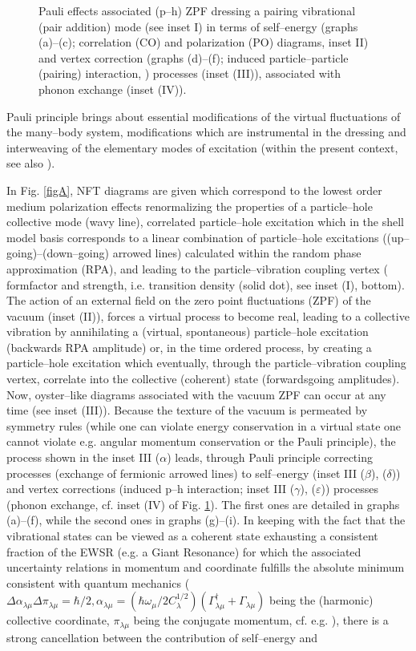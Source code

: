 \begin{subappendices}
\begin{figure}[h!]
\begin{center}
\end{center}
\caption{Pauli effects associated (p--h) ZPF dressing a pairing vibrational (pair addition) mode (see inset I) in terms of self--energy (graphs (a)--(c); correlation (CO) and polarization (PO) diagrams, inset II) and vertex correction (graphs (d)--(f); induced particle--particle (pairing) interaction, ) processes (inset (III)), associated with phonon exchange (inset (IV)).}\label{figB}
\end{figure}
Pauli principle \citep{Pauli:25} brings about essential modifications of the virtual fluctuations of the many--body system, modifications which are instrumental in the dressing and interweaving of the elementary modes of excitation  (within the present context, see also \cite{Schrieffer:64}).


In Fig.  \ref{figA}, NFT diagrams are given which correspond to the lowest order medium polarization effects renormalizing the properties of a particle--hole collective mode (wavy line), correlated particle--hole excitation which in the shell model basis corresponds to a  linear combination of particle--hole excitations ((up--going)--(down--going) arrowed lines)  calculated within the random phase approximation (RPA), and leading to the particle--vibration coupling vertex ( formfactor and strength, i.e. transition density (solid dot), see inset (I), bottom). The action of an external field on the zero point fluctuations (ZPF) of the vacuum (inset (II)), forces a virtual process to become real, leading to a collective vibration by annihilating a (virtual, spontaneous) particle--hole excitation (backwards RPA amplitude) or, in the time ordered process, by creating a particle--hole excitation which eventually, through the particle--vibration coupling vertex, correlate into the collective (coherent) state (forwardsgoing amplitudes). Now, oyster--like diagrams associated with the vacuum ZPF can occur at any time (see inset (III)). Because the texture of the vacuum is permeated by symmetry rules (while one can violate energy conservation in a virtual state one cannot violate e.g. angular momentum conservation or the Pauli principle), the process shown in the inset III ($\alpha$) leads, through Pauli principle correcting processes (exchange of fermionic arrowed lines) to self--energy (inset III ($\beta$), ($\delta$)) and vertex corrections (induced p--h interaction; inset III ($\gamma$), ($\varepsilon$)) processes (phonon exchange, cf. inset (IV) of Fig. \ref{figB}). The first ones are detailed in graphs (a)--(f), while the second ones in graphs (g)--(i). In keeping with the fact that the vibrational states can be viewed as a coherent state exhausting a consistent fraction of the EWSR (e.g. a Giant Resonance) for which the associated uncertainty relations in momentum and coordinate fulfills the absolute minimum consistent with quantum mechanics ($\Delta \alpha_{\lambda\mu} \Delta \pi_{\lambda\mu}=\hbar/2,\alpha_{\lambda\mu}=(\hbar \omega_\mu/2C_\lambda^{1/2})(\Gamma^\dagger_{\lambda\mu}+\Gamma_{\lambda\mu})$ being the (harmonic) collective coordinate, $\pi_{\lambda\mu}$ being the conjugate momentum, cf. e.g. \cite{Glauber:69}), there is a strong cancellation between the contribution of self--energy and 
\end{subappendices}
